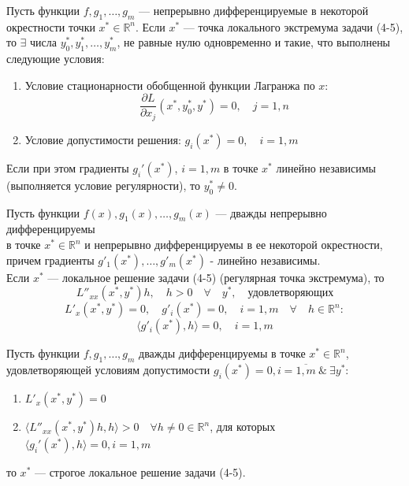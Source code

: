 \documentclass[17pt]{extarticle}
\begin{document}
\begin{theorem}
    Пусть функции \( f, g_1, \ldots, g_m \) — непрерывно дифференцируемые в некоторой окрестности точки \( x^* \in \mathbb{R}^n \).
    Если \( x^* \) — точка локального экстремума задачи (4-5), то \(\exists\) числа \( y_0^*, y_1^*, \ldots, y_m^* \),
    не равные нулю одновременно и такие, что выполнены следующие условия:
    \begin{enumerate}
        \item Условие стационарности обобщенной функции Лагранжа по \( x \):
              \[
                  \frac{\partial L}{\partial x_j} \left( x^*, y_0^*, y^* \right) = 0, \quad j = 1, n
              \]

        \item Условие допустимости решения: \(g_i \left( x^* \right) = 0, \quad i = 1, m\)
    \end{enumerate}

    Если при этом градиенты \( g_i' \left( x^* \right) \),
    \( i = 1, m \) в точке \( x^* \) линейно независимы (выполняется условие регулярности), то \( y_0^* \neq 0 \).
\end{theorem}

\begin{theorem}
    Пусть функции \( f(x), g_1(x), \ldots, g_m(x) \) — дважды непрерывно дифференцируемы \\
    в точке \( x^* \in \mathbb{R}^n \) и непрерывно дифференцируемы в ее некоторой окрестности, \\
    причем градиенты \(g'_1(x^*), \ldots, g'_m(x^*)\) - линейно независимы. \\
    Если \( x^* \) — локальное решение задачи (4-5) (регулярная точка экстремума), то
    \[
        L''_{xx}(x^*, y^*) h, \quad h > 0 \quad \forall \quad y^*, \quad \text{удовлетворяющих}
    \]
    \[
        L'_x(x^*, y^*) = 0, \quad g'_i(x^*) = 0, \quad i = 1, m \quad \forall \quad h \in \mathbb{R}^n:
    \]
    \[
        \langle g'_i(x^*), h \rangle = 0, \quad i = 1, m
    \]
\end{theorem}

\begin{theorem}
    Пусть функции \( f, g_1, \ldots, g_m \) дважды дифференцируемы в точке \(x^* \in \mathbb{R}^n\),
    удовлетворяющей условиям допустимости $g_i(x^*) = 0, i = \overline{1, m} \ \& \ \exists y^*$:
    \begin{enumerate}
        \item $L'_x(x^*, y^*) = 0$
        \item $\langle L''_{xx}(x^*, y^*) h, h \rangle > 0 \quad \forall h \neq 0 \in \mathbb{R}^n$,
              для которых $\langle g_i'(x^*), h \rangle = 0, i = 1, m$
    \end{enumerate}
    то \( x^* \) — строгое локальное решение задачи (4-5).
\end{theorem}
\end{document}
